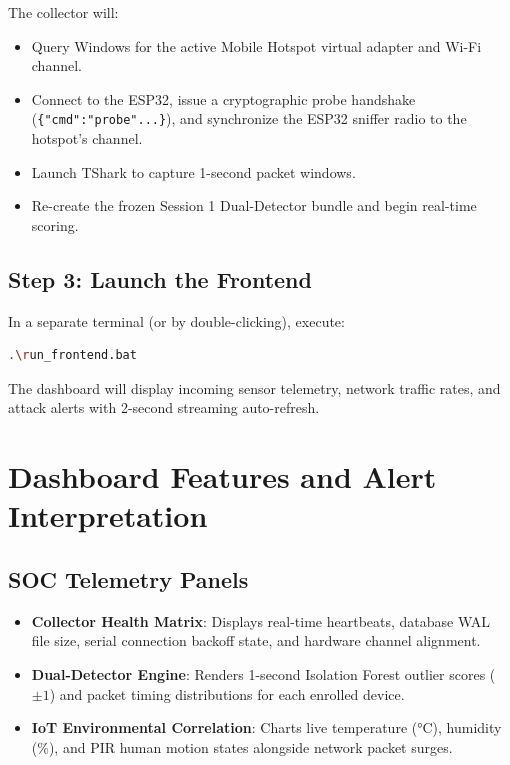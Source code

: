 \documentclass[11pt,a4paper]{article}
\begin{document}
The collector will:
\begin{itemize}[noitemsep]
    \item Query Windows for the active Mobile Hotspot virtual adapter and Wi-Fi channel.
    \item Connect to the ESP32, issue a cryptographic probe handshake (\texttt{\{"cmd":"probe"...\}}), and synchronize the ESP32 sniffer radio to the hotspot's channel.
    \item Launch TShark to capture 1-second packet windows.
    \item Re-create the frozen Session 1 Dual-Detector bundle and begin real-time scoring.
\end{itemize}

\subsection{Step 3: Launch the Frontend}
In a separate terminal (or by double-clicking), execute:
\begin{lstlisting}[language=bash, numbers=none]
.\run_frontend.bat
\end{lstlisting}
The dashboard will display incoming sensor telemetry, network traffic rates, and attack alerts with 2-second streaming auto-refresh.

\section{Dashboard Features and Alert Interpretation}

\subsection{SOC Telemetry Panels}
\begin{itemize}
    \item \textbf{Collector Health Matrix}: Displays real-time heartbeats, database WAL file size, serial connection backoff state, and hardware channel alignment.
    \item \textbf{Dual-Detector Engine}: Renders 1-second Isolation Forest outlier scores ($\pm 1$) and packet timing distributions for each enrolled device.
    \item \textbf{IoT Environmental Correlation}: Charts live temperature (°C), humidity (\%), and PIR human motion states alongside network packet surges.
\end{itemize}
\end{document}
